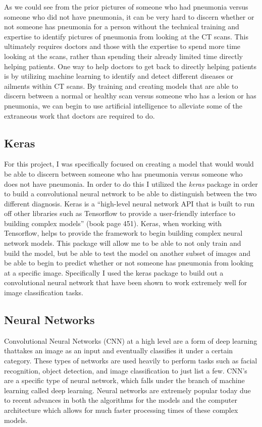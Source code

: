 \documentclass[12pt]{article}
\begin{document}
As we could see from the prior pictures of someone who had pneumonia
versus someone who did not have pneumonia, it can be very hard to
discern whether or not someone has pneumonia for a person without the
technical training and expertise to identify pictures of pneumonia from
looking at the CT scans. This ultimately requires doctors and those with
the expertise to spend more time looking at the scans, rather than
spending their already limited time directly helping patients. One way
to help doctors to get back to directly helping patients is by utilizing
machine learning to identify and detect different diseases or ailments
within CT scans. By training and creating models that are able to
discern between a normal or healthy scan versus someone who has a lesion
or has pneumonia, we can begin to use artificial intelligence to
alleviate some of the extraneous work that doctors are required to do.

\hypertarget{keras}{%
\subsection{Keras}\label{keras}}

For this project, I was specifically focused on creating a model that
would would be able to discern between someone who has pneumonia versus
someone who does not have pneumonia. In order to do this I utilized the
\emph{keras} package in order to build a convolutional neural network to
be able to distinguish between the two different diagnosis. Keras is a
``high-level neural network API that is built to run off other libraries
such as Tensorflow to provide a user-friendly interface to building
complex models'' (book page 451). Keras, when working with Tensorflow,
helps to provide the framework to begin building complex neural network
models. This package will allow me to be able to not only train and
build the model, but be able to test the model on another subset of
images and be able to begin to predict whether or not someone has
pneumonia from looking at a specific image. Specifically I used the
keras package to build out a convolutional neural network that have been
shown to work extremely well for image classification tasks.

\hypertarget{neural-networks}{%
\subsection{Neural Networks}\label{neural-networks}}

Convolutional Neural Networks (CNN) at a high level are a form of deep
learning thattakes an image as an input and eventually classifies it
under a certain category. These types of networks are used heavily to
perform tasks such as facial recognition, object detection, and image
classification to just list a few. CNN's are a specific type of neural
network, which falls under the branch of machine learning called deep
learning. Neural networks are extremely popular today due to recent
advances in both the algorithms for the models and the computer
architecture which allows for much faster processing times of these
complex models.
\end{document}

